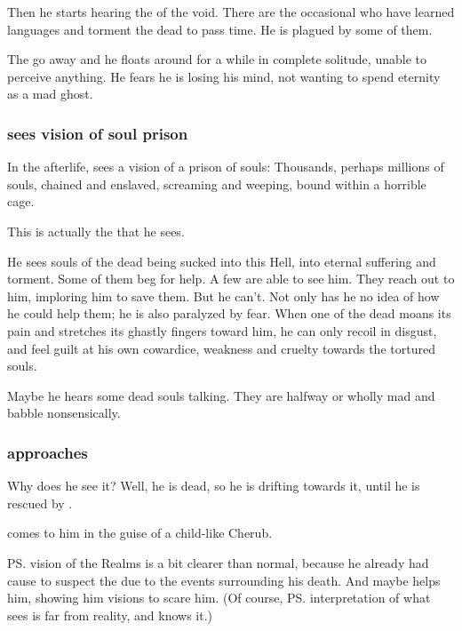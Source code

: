 Then he starts hearing the \daemons{} of the void. There are the occasional \daemons{} who have learned \Miithian{} languages and torment the dead to pass time. He is plagued by some of them. 

The \daemons{} go away and he floats around for a while in complete solitude, unable to perceive anything. He fears he is losing his mind, not wanting to spend eternity as a mad ghost. 






\subsubsection{\Icor{} sees vision of soul prison}
In the afterlife, \Icor{} sees a vision of a prison of souls: Thousands, perhaps millions of souls, chained and enslaved, screaming and weeping, bound within a horrible cage. 

This is actually the \Sephiroth{} that he sees. 

He sees souls of the dead being sucked into this Hell, into eternal suffering and torment. Some of them beg for help. A few are able to see him. They reach out to him, imploring him to save them. But he can't. Not only has he no idea of how he could help them; he is also paralyzed by fear. When one of the dead moans its pain and stretches its ghastly fingers toward him, he can only recoil in disgust, and feel guilt at his own cowardice, weakness and cruelty towards the tortured souls. 

Maybe he hears some dead souls talking. They are halfway or wholly mad and babble nonsensically. 






\subsubsection{\Psyrex{} approaches \Icor}
Why does he see it? 
Well, he is dead, so he is drifting towards it, until he is rescued by \Psyrex. 

\Psyrex{} comes to him in the guise of a child-like Cherub. 
 
\ps{\Icor} vision of the Realms is a bit clearer than normal, because he already had cause to suspect the \Sephiroth{} due to the events surrounding his death. 
And maybe \Psyrex{} helps him, showing him visions to scare him. 
(Of course, \ps{\Psyrex}{} interpretation of what \Icor{} sees is far from reality, and \Psyrex{} knows it.)

